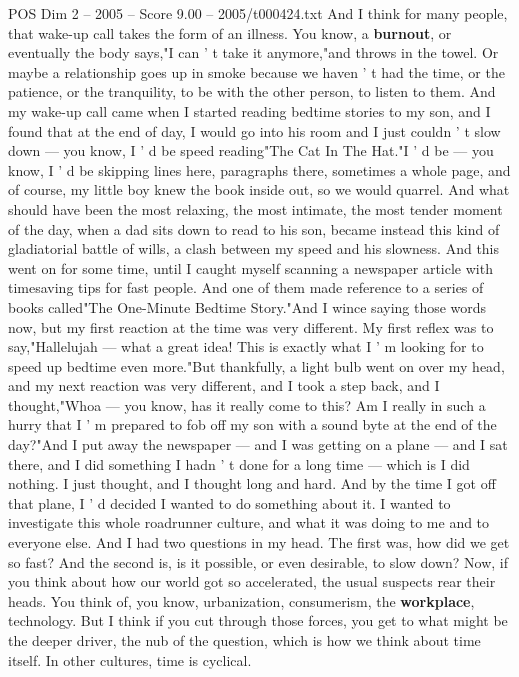 \begin{textsample}{POS Dim 2 – 2005 – Score 9.00 – 2005/t000424.txt}
And I think for many people, that wake-up call takes the form of an illness.
You know, a \textbf{burnout}, or eventually the body says,"I can ' t take it anymore,"and throws in the towel.
Or maybe a relationship goes up in smoke because we haven ' t had the time, or the patience, or the tranquility, to be with the other person, to listen to them.
And my wake-up call came when I started reading bedtime stories to my son, and I found that at the end of day, I would go into his room and I just couldn ' t slow down — you know, I ' d be speed reading"The Cat In The Hat."I ' d be — you know, I ' d be skipping lines here, paragraphs there, sometimes a whole page, and of course, my little boy knew the book inside out, so we would quarrel.
And what should have been the most relaxing, the most intimate, the most tender moment of the day, when a dad sits down to read to his son, became instead this kind of gladiatorial battle of wills, a clash between my speed and his slowness.
And this went on for some time, until I caught myself scanning a newspaper article with timesaving tips for fast people.
And one of them made reference to a series of books called"The One-Minute Bedtime Story."And I wince saying those words now, but my first reaction at the time was very different.
My first reflex was to say,"Hallelujah — what a great idea!
This is exactly what I ' m looking for to speed up bedtime even more."But thankfully, a light bulb went on over my head, and my next reaction was very different, and I took a step back, and I thought,"Whoa — you know, has it really come to this?
Am I really in such a hurry that I ' m prepared to fob off my son with a sound byte at the end of the day?"And I put away the newspaper — and I was getting on a plane — and I sat there, and I did something I hadn ' t done for a long time — which is I did nothing.
I just thought, and I thought long and hard.
And by the time I got off that plane, I ' d decided I wanted to do something about it.
I wanted to investigate this whole roadrunner culture, and what it was doing to me and to everyone else.
And I had two questions in my head.
The first was, how did we get so fast?
And the second is, is it possible, or even desirable, to slow down?
Now, if you think about how our world got so accelerated, the usual suspects rear their heads.
You think of, you know, urbanization, consumerism, the \textbf{workplace}, technology.
But I think if you cut through those forces, you get to what might be the deeper driver, the nub of the question, which is how we think about time itself.
In other cultures, time is cyclical.

\end{textsample}
